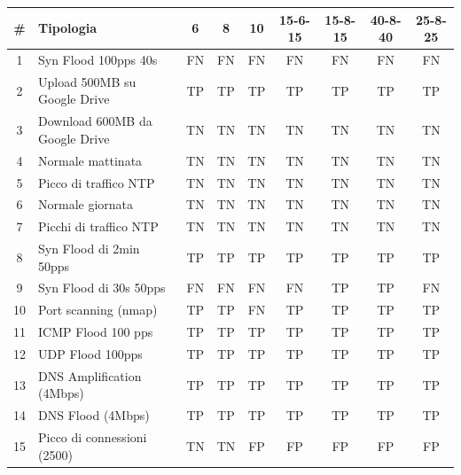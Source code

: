 \begin{table}
    \begin{tabularx}{\textwidth}{||c X c c c c c c c||} 
        \hline
        \# & Tipologia & 6 & 8 & 10 & 15-6-15 & 15-8-15 & 40-8-40 & 25-8-25\\ [0.5ex] 
        \hline\hline
        1 & Syn Flood 100pps 40s & \cellcolor{magenta} FN & \cellcolor{magenta} FN & \cellcolor{magenta} FN & \cellcolor{magenta} FN & \cellcolor{magenta} FN & \cellcolor{magenta} FN & \cellcolor{magenta} FN\\ 
        \hline
        2 & Upload 500MB su Google Drive & TP & TP & TP & TP & TP & TP & TP \\ 
        \hline
        3 &  Download 600MB da Google Drive & TN  & TN & TN & TN & TN & TN & TN\\ 
        \hline 
        4 & Normale mattinata & TN & TN & TN & TN & TN & TN & TN\\
        \hline
        5 & Picco di traffico NTP & TN & TN & TN & TN & TN & TN & TN\\
        \hline
        6 & Normale giornata & TN & TN & TN & TN & TN & TN & TN\\ 
        \hline
        7 & Picchi di traffico NTP & TN & TN & TN & TN & TN & TN & TN \\ 
        \hline 
        8 & Syn Flood di 2min 50pps & TP & TP & TP & TP & TP & TP & TP\\
        \hline
        9 & Syn Flood di 30s 50pps & \cellcolor{magenta} FN & \cellcolor{magenta} FN & \cellcolor{magenta} FN & \cellcolor{magenta} FN & TP & TP & \cellcolor{magenta} FN \\        
        \hline
        10 & Port scanning (nmap) & TP & TP & \cellcolor{magenta} FN & TP & TP & TP & TP  \\
        \hline
        11 & ICMP Flood 100 pps & TP & TP & TP & TP & TP & TP & TP\\
        \hline
        12 & UDP Flood 100pps & TP & TP & TP & TP & TP & TP & TP\\ 
        \hline
        13 & DNS Amplification (4Mbps) & TP & TP & TP & TP & TP & TP & TP\\ 
        \hline 
        14 & DNS Flood (4Mbps) & TP & TP & TP & TP & TP & TP & TP\\
        \hline
        15 & Picco di connessioni (2500) & TN & TN & \cellcolor{orange} FP & \cellcolor{orange} FP & \cellcolor{orange} FP & \cellcolor{orange} FP & \cellcolor{orange} FP\\        
        \hline 

\end{tabularx}
\end{table}
